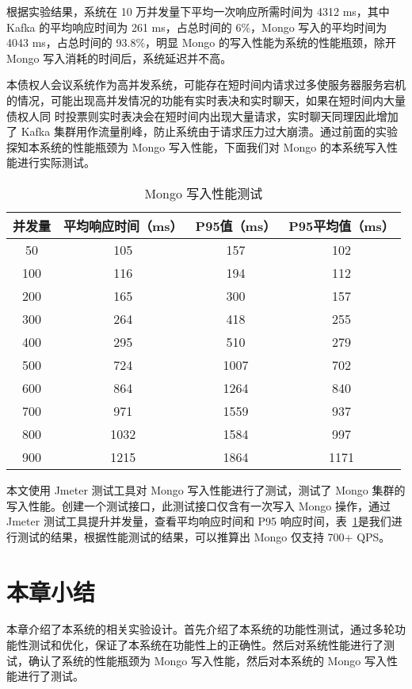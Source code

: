   根据实验结果，系统在 10 万并发量下平均一次响应所需时间为 4312 ms，其中 Kafka 的平均响应时间为 261 ms，占总时间的 6\%，Mongo 写入的平均时间为 4043 ms，占总时间的 93.8\%，明显 Mongo 的写入性能为系统的性能瓶颈，除开 Mongo 写入消耗的时间后，系统延迟并不高。

  本债权人会议系统作为高并发系统，可能存在短时间内请求过多使服务器服务宕机
的情况，可能出现高并发情况的功能有实时表决和实时聊天，如果在短时间内大量债权人同
时投票则实时表决会在短时间内出现大量请求，实时聊天同理因此增加了 Kafka 集群用作流量削峰，防止系统由于请求压力过大崩溃。通过前面的实验探知本系统的性能瓶颈为 Mongo 写入性能，下面我们对 Mongo 的本系统写入性能进行实际测试。

\begin{table}[h!]
  \begin{center}
    \caption{Mongo 写入性能测试}
    \label{fig:test5}
    \begin{tabular}{ c c c c }
      \hline
      \textbf{并发量} & \textbf{平均响应时间（ms）
      } & \textbf{P95值（ms）
      } & \textbf{P95平均值（ms）
      } \\
      \hline
      50 & 105 & 157 & 102 \\
      100 & 116 & 194 & 112 \\
      200 & 165 & 300 & 157 \\
      300 & 264 & 418 & 255 \\
      400 & 295 & 510 & 279 \\
      500 & 724 & 1007 & 702 \\
      600 & 864 & 1264 & 840 \\
      700 & 971 & 1559 & 937 \\
      800 & 1032 & 1584 & 997 \\
      900 & 1215 & 1864 & 1171 \\
      \hline
    \end{tabular}
  \end{center}
\end{table}

本文使用 Jmeter 测试工具对 Mongo 写入性能进行了测试，测试了 Mongo 集群的写入性能。创建一个测试接口，此测试接口仅含有一次写入 Mongo 操作，通过 Jmeter 测试工具提升并发量，查看平均响应时间和 P95 响应时间，表~\ref{fig:test5}是我们进行测试的结果，根据性能测试的结果，可以推算出 Mongo 仅支持 700+ QPS。

  \section{本章小结}
  本章介绍了本系统的相关实验设计。首先介绍了本系统的功能性测试，通过多轮功能性测试和优化，保证了本系统在功能性上的正确性。然后对系统性能进行了测试，确认了系统的性能瓶颈为 Mongo 写入性能，然后对本系统的 Mongo 写入性能进行了测试。